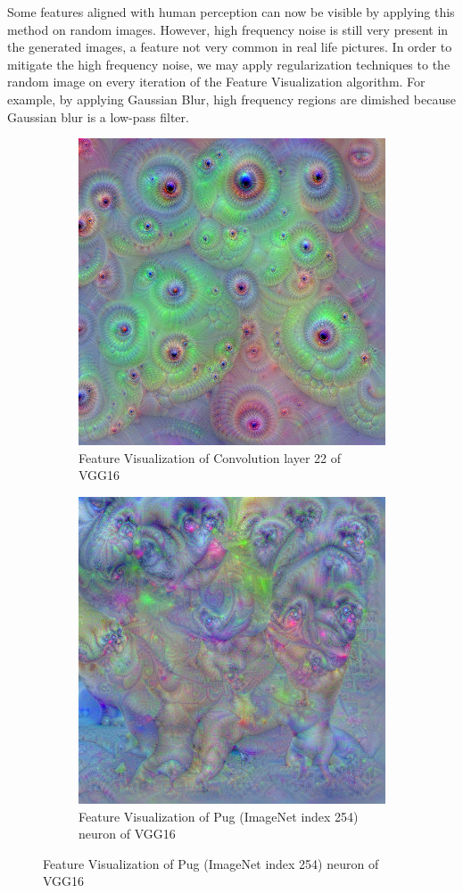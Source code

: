 Some features aligned with human perception can now be visible by applying this method on random images. 
However, high frequency noise is still very present in the generated images, a feature not very common in real life pictures.
In order to mitigate the high frequency noise, we may apply regularization techniques to the random image on every iteration of the Feature Visualization algorithm.
For example, by applying Gaussian Blur, high frequency regions are dimished because Gaussian blur is a low-pass filter.

\begin{figure}
    \captionsetup{justification=centering}

    \begin{subfigure}[t]{0.45\textwidth}
        \captionsetup{justification=centering}
        \centering
        \includegraphics[width=.7\linewidth]{figuras/feat_vis/random_image_dream_reg.png}
        \caption{Feature Visualization of Convolution layer 22 of VGG16}
        \label{fig:feat_conv_L22_reg}
    \end{subfigure}
    \hfill
    \begin{subfigure}[t]{0.45\textwidth}
        \captionsetup{justification=centering}
        \centering
        \includegraphics[width=.7\linewidth]{figuras/feat_vis/random_image_dream_pug_254_reg.png}
        \caption{Feature Visualization of Pug (ImageNet index 254) neuron of VGG16}
        \label{fig:feat_conv_I254_reg}
    \end{subfigure}


\end{figure}
